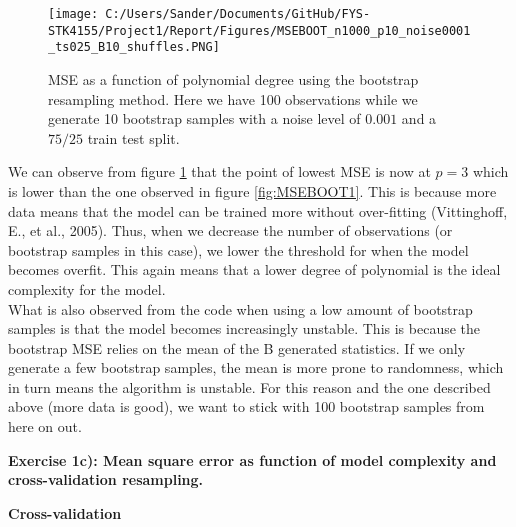 \documentclass[12pt,a4paper]{article}
\begin{document}
\begin{figure}[H]
\centering
\texttt{[image: C:/Users/Sander/Documents/GitHub/FYS-STK4155/Project1/Report/Figures/MSEBOOT\_n1000\_p10\_noise0001\_ts025\_B10\_shuffles.PNG]}
\caption{\label{fig:MSEBOOT2} MSE as a function of polynomial degree using the bootstrap resampling method. Here we have 100 observations while we generate 10 bootstrap samples with a noise level of $0.001$ and a $75/25$ train test split.}
\end{figure}

\noindent We can observe from figure \ref{fig:MSEBOOT2} that the point of lowest MSE is now at $p = 3$ which is lower than the one observed in figure \ref{fig:MSEBOOT1}. This is because more data means that the model can be trained more without over-fitting (Vittinghoff, E., et al., 2005). Thus, when we decrease the number of observations (or bootstrap samples in this case), we lower the threshold for when the model becomes overfit. This again means that a lower degree of polynomial is the ideal complexity for the model. 
\\
What is also observed from the code when using a low amount of bootstrap samples is that the model becomes increasingly unstable. This is because the bootstrap MSE relies on the mean of the B generated statistics. If we only generate a few bootstrap samples, the mean is more prone to randomness, which in turn means the algorithm is unstable. For this reason and the one described above (more data is good), we want to stick with 100 bootstrap samples from here on out.

\newpage

\begin{center}
\large{\textbf{Exercise 1c): Mean square error as function of model complexity and cross-validation resampling.}}
\end{center}

\begin{center}
\large{\textbf{Cross-validation}}
\end{center}
\end{document}
